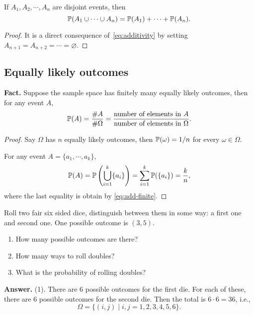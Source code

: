   \begin{corollary}
    If $A_1, A_2, \cdots, A_n$ are disjoint events, then
    \begin{equation}
      \label{eq:add-finite}
      \mathbb{P}(A_1\cup \cdots \cup A_n) = \mathbb{P}(A_1) + \cdots + \mathbb{P}(A_n).
    \end{equation}
  \end{corollary}

  \begin{proof}
    It is a direct consequence of~\eqref{eq:additivity} by setting $A_{n+1} =
    A_{n+2} =\cdots = \varnothing$.
  \end{proof}


  \subsection{Equally likely outcomes}
  \label{subsec:1.2}
  \textbf{Fact.} Suppose the sample space has finitely many equally likely
  outcomes, then for any event $A$,
  \[
    \mathbb{P}(A) = \frac{\# A}{\# \Omega} = \frac{\text{number of elements in
        $A$}}{\text{number of elements in $\Omega$}}.
  \]
  \begin{proof}
    Say $\Omega$ has $n$ equally likely outcomes, then $\mathbb{P}(\omega) = 1/n$ for
    every $\omega \in \Omega$.

    For any event $A = \{a_1, \cdots, a_k\}$,
    \[
      \mathbb{P}(A) = \mathbb{P}\left( \bigcup_{i=1}^k \{a_i\}\right) =
      \sum_{i=1}^k\mathbb{P}(\{a_i\}) = \frac{k}{n},
    \]
    where the last equality is obtain by \eqref{eq:add-finite}.
  \end{proof}

  \begin{example}
    Roll two fair six sided dice, distinguish between them in some way: a first
    one and second one. One possible outcome is $(3,5)$.
    \begin{enumerate}
      [(1)]
    \item How many possible outcomes are there?
    \item How many ways to roll doubles?
    \item What is the probability of rolling doubles?
    \end{enumerate}
  \end{example}

  \textbf{Answer.} (1). There are $6$ possible outcomes for the first die. For
  each of these, there are $6$ possible outcomes for the second die. Then the
  total is $6\cdot 6 = 36$, i.e.,
  \[
    \Omega = \{(i,j)\mid i,j = 1,2,3,4,5,6\}.
  \]

